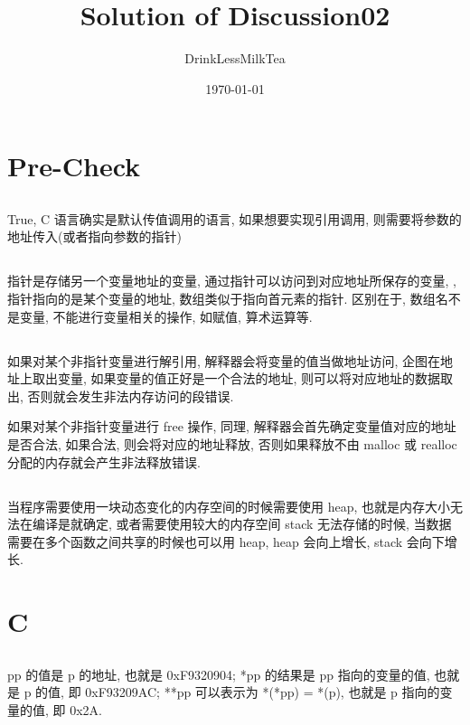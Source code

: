 \documentclass[UTF8,nofonts]{ctexart}
\title{Solution of Discussion02}
\author{DrinkLessMilkTea}
\date{\today}
\begin{document}
\maketitle
\section{Pre-Check}
\subsection{}
True, C 语言确实是默认传值调用的语言, 如果想要实现引用调用, 则需要将参数的地址传入(或者指向参数的指针)

\subsection{}
指针是存储另一个变量地址的变量, 通过指针可以访问到对应地址所保存的变量, , 指针指向的是某个变量的地址, 数组类似于指向首元素的指针. 区别在于, 数组名不是变量, 不能进行变量相关的操作, 如赋值, 算术运算等.

\subsection{}
如果对某个非指针变量进行解引用, 解释器会将变量的值当做地址访问, 企图在地址上取出变量, 如果变量的值正好是一个合法的地址, 则可以将对应地址的数据取出, 否则就会发生非法内存访问的段错误.

如果对某个非指针变量进行 free 操作, 同理, 解释器会首先确定变量值对应的地址是否合法, 如果合法, 则会将对应的地址释放, 否则如果释放不由 malloc 或 realloc 分配的内存就会产生非法释放错误.

\subsection{}
当程序需要使用一块动态变化的内存空间的时候需要使用 heap, 也就是内存大小无法在编译是就确定, 或者需要使用较大的内存空间 stack 无法存储的时候, 当数据需要在多个函数之间共享的时候也可以用 heap, heap 会向上增长, stack 会向下增长.

\section{C}
\subsection{}
pp 的值是 p 的地址, 也就是 0xF9320904; *pp 的结果是 pp 指向的变量的值, 也就是 p 的值, 即 0xF93209AC; **pp 可以表示为 *(*pp) = *(p), 也就是 p 指向的变量的值, 即 0x2A.
\end{document}
